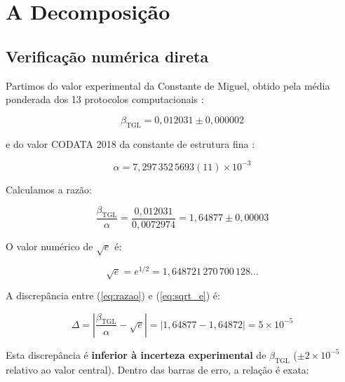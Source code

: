 \documentclass[12pt,a4paper,twoside]{article}
\newcommand{\betatgl}{\beta_{\!\scriptscriptstyle\mathrm{TGL}}}
\begin{document}

\section{A Decomposição}
\label{sec:decomposicao}

\subsection{Verificação numérica direta}

Partimos do valor experimental da Constante de Miguel, obtido pela média ponderada dos 13 protocolos computacionais \cite{Miguel2026Fronteira}:

\begin{equation}
\betatgl = 0{,}012031 \pm 0{,}000002
\end{equation}

\noindent e do valor CODATA 2018 da constante de estrutura fina \cite{CODATA2018}:

\begin{equation}
\alpha = 7{,}297\,352\,5693(11) \times 10^{-3}
\end{equation}

Calculamos a razão:

\begin{equation}
\frac{\betatgl}{\alpha} = \frac{0{,}012031}{0{,}0072974} = 1{,}64877 \pm 0{,}00003
\label{eq:razao}
\end{equation}

O valor numérico de $\sqrt{e}$ é:

\begin{equation}
\sqrt{e} = e^{1/2} = 1{,}648721\,270\,700\,128\ldots
\label{eq:sqrt_e}
\end{equation}

A discrepância entre (\ref{eq:razao}) e (\ref{eq:sqrt_e}) é:

\begin{equation}
\Delta = \left|\frac{\betatgl}{\alpha} - \sqrt{e}\right| = |1{,}64877 - 1{,}64872| = 5 \times 10^{-5}
\end{equation}

Esta discrepância é \textbf{inferior à incerteza experimental} de $\betatgl$ ($\pm 2 \times 10^{-5}$ relativo ao valor central). Dentro das barras de erro, a relação é exata:
\end{document}
